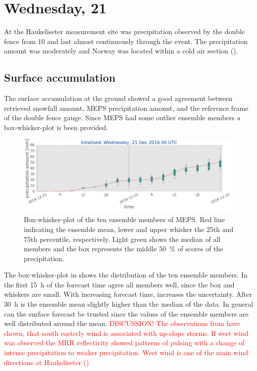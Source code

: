 \section{Wednesday, \SI{21}{\dec}}\label{sec:2112}

At the Haukeliseter measurement site was precipitation observed by the double fence from \SI{10}{\UTC} and last almost continuously through the event. The precipitation amount was moderately and Norway was located within a cold air section (). 

\subsection{Surface accumulation}
The surface accumulation at the ground showed a good agreement between retrieved snowfall amount, MEPS precipitation amount, and the reference frame of the double fence gauge. Since MEPS had some outlier ensemble members a box-whisker-plot is been provided.
\begin{figure}[t]
	\includegraphics[width=\textwidth]{./fig_boxplot_sfc/20161221_0}
	\caption{Box-whisker-plot of the ten ensemble members of MEPS. Red line indicating the ensemble mean, lower and upper whisker the 25th and 75th percentile, respectively. Light green shows the median of all members and the box represents the middle \SI{50}{\percent} of scores of the precipitation.}\label{fig:boxplt21}
\end{figure}
The box-whisker-plot in  shows the distribution of the ten ensemble members. In the first \SI{15}{\hour} of the forecast time agree all members well, since the box and whiskers are small. With increasing forecast time, increases the uncertainty. After \SI{30}{\hour} is the ensemble mean slightly higher than the median of the data. In general can the surface forecast be trusted since the values of the ensemble members are well distributed around the mean.
\textcolor{red}{DISCUSSION! The observations from  have shown, that south easterly wind is associated with up-slope storms. If west wind was observed the MRR reflectivity showed patterns of pulsing with a change of intense precipitation to weaker precipitation. West wind is one of the main wind directions at Haukeliseter ()   }
